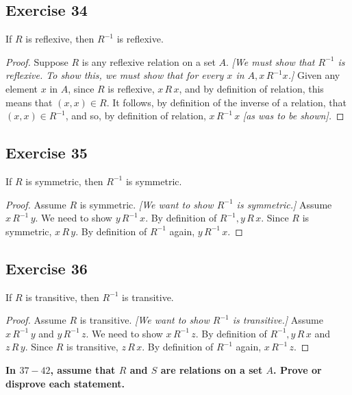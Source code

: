 \documentclass[14pt]{extarticle}
\newcommand{\cy}{\color{cyan}}
\begin{document}
\subsection{Exercise 34}
If \(R\) is reflexive, then \(R^{-1}\) is reflexive.

\begin{proof}
        Suppose $R$ is any reflexive relation on a set $A$. {\it [We must show that \(R^{-1}\) is reflexive. To show this,
                                we must show that for every \(x\) in \(A, x \, R^{-1} x\).]} Given any element \(x\) in \(A\), since \(R\) is
        reflexive, \(x \,R\, x\), and by definition of relation, this means that \((x, x) \in R\). It follows, by definition
        of the inverse of a relation, that \((x, x) \in R^{-1}\), and so, by definition of relation, \(x \,R^{-1}\, x\) {\it
                        [as was to be shown].}
\end{proof}

\subsection{Exercise 35}
If \(R\) is symmetric, then \(R^{-1}\) is symmetric.

\begin{proof}
        Assume \(R\) is symmetric. {\it [We want to show \(R^{-1}\) is symmetric.]} Assume \(x \, R^{-1} \, y\). We need to
        show \(y \, R^{-1} \, x\). By definition of \(R^{-1}, y \, R \, x\). Since \(R\) is symmetric, \(x \, R \, y\). By
        definition of \(R^{-1}\) again, \(y \, R^{-1} \, x\).
\end{proof}

\subsection{Exercise 36}
If \(R\) is transitive, then \(R^{-1}\) is transitive.

\begin{proof}
        Assume \(R\) is transitive. {\it [We want to show \(R^{-1}\) is transitive.]} Assume \(x \, R^{-1} \, y\) and \(y \,
        R^{-1} \, z\). We need to show \(x \, R^{-1} \, z\). By definition of \(R^{-1}, y \, R \, x\) and \(z \, R \, y\).
        Since \(R\) is transitive, \(z \, R \, x\). By definition of \(R^{-1}\) again, \(x \, R^{-1} \, z\).
\end{proof}

{\bf \cy In $37-42$, assume that \(R\) and \(S\) are relations on a set \(A\). Prove or disprove each
statement.}
\end{document}
